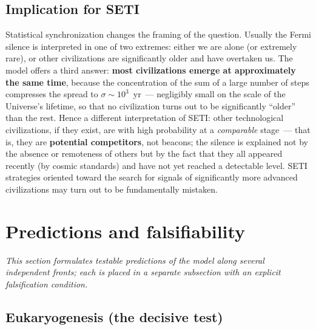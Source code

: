 \documentclass[11pt,a4paper]{article}
\begin{document}
\subsection{Implication for SETI}
\label{sec:seti}

Statistical synchronization changes the framing of the question. Usually the Fermi silence is interpreted in one of two extremes: either we are alone (or extremely rare), or other civilizations are significantly older and have overtaken us. The model offers a third answer: \textbf{most civilizations emerge at approximately the same time}, because the concentration of the sum of a large number of steps compresses the spread to $\sigma \sim 10^3$~yr~--- negligibly small on the scale of the Universe's lifetime, so that no civilization turns out to be significantly ``older'' than the rest. Hence a different interpretation of SETI: other technological civilizations, if they exist, are with high probability at a \emph{comparable} stage~--- that is, they are \textbf{potential competitors}, not beacons; the silence is explained not by the absence or remoteness of others but by the fact that they all appeared recently (by cosmic standards) and have not yet reached a detectable level. SETI strategies oriented toward the search for signals of significantly more advanced civilizations may turn out to be fundamentally mistaken.

\section{Predictions and falsifiability}
\label{sec:predictions}

\textit{This section formulates testable predictions of the model along several independent fronts; each is placed in a separate subsection with an explicit falsification condition.}

\subsection{Eukaryogenesis (the decisive test)}
\label{sec:eukaryo}
\end{document}
